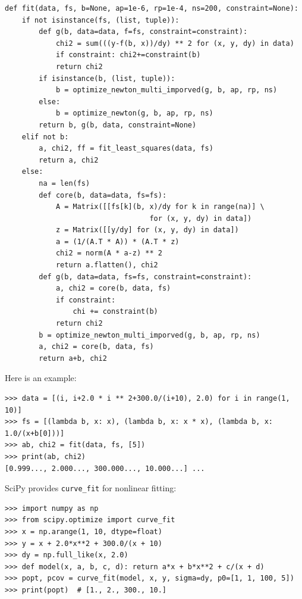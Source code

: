 \documentclass[justified, sixbynine]{tufte-book}
\def\ft{\small\tt}
\theoremstyle{plain}%
\newtheorem * {corollary}{Corollary}
\theoremstyle{definition}
\theoremstyle{remark}
\newtheorem * {remark}{Remark}
\newtheorem * {note}{Note}
\begin{document}
\begin{fullwidth}
\begin{lstlisting}[caption={in file: {\ft nlib.py}}]
def fit(data, fs, b=None, ap=1e-6, rp=1e-4, ns=200, constraint=None):
    if not isinstance(fs, (list, tuple)):
        def g(b, data=data, f=fs, constraint=constraint):
            chi2 = sum(((y-f(b, x))/dy) ** 2 for (x, y, dy) in data)
            if constraint: chi2+=constraint(b)
            return chi2
        if isinstance(b, (list, tuple)):
            b = optimize_newton_multi_imporved(g, b, ap, rp, ns)
        else:
            b = optimize_newton(g, b, ap, rp, ns)
        return b, g(b, data, constraint=None)
    elif not b:
        a, chi2, ff = fit_least_squares(data, fs)
        return a, chi2
    else:
        na = len(fs)
        def core(b, data=data, fs=fs):
            A = Matrix([[fs[k](b, x)/dy for k in range(na)] \
                                  for (x, y, dy) in data])
            z = Matrix([[y/dy] for (x, y, dy) in data])
            a = (1/(A.T * A)) * (A.T * z)
            chi2 = norm(A * a-z) ** 2
            return a.flatten(), chi2
        def g(b, data=data, fs=fs, constraint=constraint):
            a, chi2 = core(b, data, fs)
            if constraint:
                chi += constraint(b)
            return chi2
        b = optimize_newton_multi_imporved(g, b, ap, rp, ns)
        a, chi2 = core(b, data, fs)
        return a+b, chi2
\end{lstlisting}

Here is an example:

\begin{lstlisting}
>>> data = [(i, i+2.0 * i ** 2+300.0/(i+10), 2.0) for i in range(1, 10)]
>>> fs = [(lambda b, x: x), (lambda b, x: x * x), (lambda b, x: 1.0/(x+b[0]))]
>>> ab, chi2 = fit(data, fs, [5])
>>> print(ab, chi2)
[0.999..., 2.000..., 300.000..., 10.000...] ...
\end{lstlisting}

SciPy provides {\ft curve\_fit} for nonlinear fitting:

\begin{lstlisting}
>>> import numpy as np
>>> from scipy.optimize import curve_fit
>>> x = np.arange(1, 10, dtype=float)
>>> y = x + 2.0*x**2 + 300.0/(x + 10)
>>> dy = np.full_like(x, 2.0)
>>> def model(x, a, b, c, d): return a*x + b*x**2 + c/(x + d)
>>> popt, pcov = curve_fit(model, x, y, sigma=dy, p0=[1, 1, 100, 5])
>>> print(popt)  # [1., 2., 300., 10.]
\end{lstlisting}



\end{fullwidth}
\end{document}
